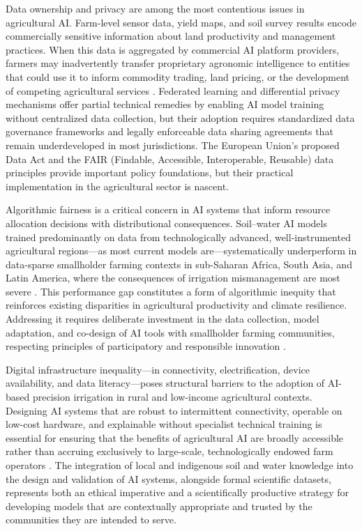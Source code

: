 \documentclass[land,review,accept,pdftex,oneauthor]{Definitions/mdpi}
\begin{document}
Data ownership and privacy are among the most contentious issues in agricultural AI. Farm-level sensor data, yield maps, and soil survey results encode commercially sensitive information about land productivity and management practices. When this data is aggregated by commercial AI platform providers, farmers may inadvertently transfer proprietary agronomic intelligence to entities that could use it to inform commodity trading, land pricing, or the development of competing agricultural services \citep{WolfButtel}. Federated learning and differential privacy mechanisms \citep{dwork2014algorithmic} offer partial technical remedies by enabling AI model training without centralized data collection, but their adoption requires standardized data governance frameworks and legally enforceable data sharing agreements that remain underdeveloped in most jurisdictions. The European Union's proposed Data Act and the FAIR (Findable, Accessible, Interoperable, Reusable) data principles \citep{wilkinson2016fair} provide important policy foundations, but their practical implementation in the agricultural sector is nascent.

Algorithmic fairness is a critical concern in AI systems that inform resource allocation decisions with distributional consequences. Soil--water AI models trained predominantly on data from technologically advanced, well-instrumented agricultural regions---as most current models are---systematically underperform in data-sparse smallholder farming contexts in sub-Saharan Africa, South Asia, and Latin America, where the consequences of irrigation mismanagement are most severe \citep{Xuetal2023}. This performance gap constitutes a form of algorithmic inequity that reinforces existing disparities in agricultural productivity and climate resilience. Addressing it requires deliberate investment in the data collection, model adaptation, and co-design of AI tools with smallholder farming communities, respecting principles of participatory and responsible innovation \citep{janssen2020responsible}.

Digital infrastructure inequality---in connectivity, electrification, device availability, and data literacy---poses structural barriers to the adoption of AI-based precision irrigation in rural and low-income agricultural contexts. Designing AI systems that are robust to intermittent connectivity, operable on low-cost hardware, and explainable without specialist technical training is essential for ensuring that the benefits of agricultural AI are broadly accessible rather than accruing exclusively to large-scale, technologically endowed farm operators \citep{shepherd2022ethics}. The integration of local and indigenous soil and water knowledge into the design and validation of AI systems, alongside formal scientific datasets, represents both an ethical imperative and a scientifically productive strategy for developing models that are contextually appropriate and trusted by the communities they are intended to serve.
\end{document}
